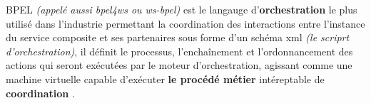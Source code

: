     \textsc{BPEL} \textit{(appelé aussi \acrshort{bpel4ws} ou
      \acrshort{ws-bpel})} est le langauge d'\textbf{orchestration}
    le plus utilisé dans l'industrie permettant la coordination des
    interactions entre l'instance du service composite et ses
    partenaires sous forme d'un schéma \acrshort{xml} \textit{(le
      scriprt d'orchestration)}, il définit le processus,
    l'enchaînement et l'ordonnancement des actions qui seront
    exécutées par le moteur d'orchestration, agissant comme une
    machine virtuelle capable d'exécuter \textbf{le procédé métier}
    intéreptable de \textbf{coordination}
    \cite{chollet2009orchestration}.






